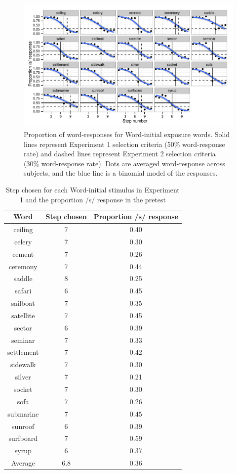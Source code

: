\begin{figure}[ht]
\caption{Proportion of word-responses for Word-initial exposure words. Solid lines represent Experiment 1 selection criteria (50\% word-response rate) and dashed lines represent Experiment 2 selection criteria (30\% word-response rate).  Dots are averaged word-response across subjects, and the blue line is a binomial model of the responses.}
\label{fig:sinitialpretest}
\begin{center}
\includegraphics[width=\textwidth]{graphs/sinitialpretest.pdf}
\end{center}
\end{figure}

\begin{table}[ht]
\caption{Step chosen for each Word-initial stimulus in Experiment 1 and the proportion /s/ response in the pretest}
\label{tbl:exp1srespinitial}
\centering
\begin{tabular}{ccc}
\toprule
Word & Step chosen & Proportion /s/ response \\
\midrule
 ceiling & 7 & 0.40 \\
celery & 7 & 0.30 \\
cement & 7 & 0.26 \\
ceremony & 7 & 0.44 \\
saddle & 8 & 0.25 \\
safari & 6 & 0.45 \\
sailboat & 7 & 0.35 \\
satellite & 7 & 0.45 \\
sector & 6 & 0.39 \\
 seminar & 7 & 0.33 \\
 settlement & 7 & 0.42 \\
 sidewalk & 7 & 0.30 \\
 silver & 7 & 0.21 \\
 socket & 7 & 0.30 \\
 sofa & 7 & 0.26 \\
 submarine & 7 & 0.45 \\
 sunroof & 6 & 0.39 \\
 surfboard & 7 & 0.59 \\
 syrup & 6 & 0.37 \\
\midrule
 Average &  6.8 & 0.36 \\

\bottomrule
\end{tabular}
\end{table}

